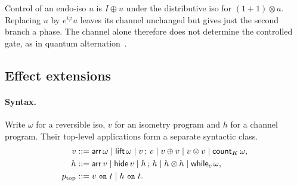 \documentclass[acmsmall,screen,review,anonymous,nonacm]{acmart}
\newcommand{\storyinlineface}{\small\ttfamily}
\newcommand{\code}[1]{\textnormal{\storyinlineface #1}}
\numberwithin{equation}{section}
\begin{document}
Control of an endo-iso $u$ is $I\oplus u$ under the distributive iso
for $(1+1)\otimes a$. Replacing $u$ by $e^{i\varphi}u$ leaves its channel unchanged but gives just
the second branch a phase. The channel alone therefore does not determine the controlled
gate, as in quantum alternation~\cite[\S~2]{BadescuPanangaden15}.

\subsection{Effect extensions}\label{app:effect-rules}
\paragraph{Syntax.}
Write $\omega$ for a reversible iso, $v$ for an isometry program and $h$
for a channel program. Their top-level applications form a separate syntactic class.
\[
\begin{aligned}
v&::=\mathsf{arr}\,\omega\mid\mathsf{lift}\,\omega\mid v\,;\,v\mid v\oplus v
                         \mid v\otimes v\mid \mathsf{count}_K\,\omega,\\
h&::=\mathsf{arr}\,v\mid\mathsf{hide}\,v\mid h\,;\,h\mid h\otimes h
                         \mid\mathsf{while}_c\,\omega,\\
p_{\rm top}&::=v\ \code{on}\ t\mid h\ \code{on}\ t.
\end{aligned}
\]
\end{document}
